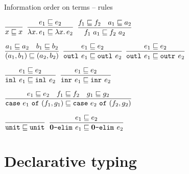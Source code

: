 \documentclass{beamer}
\begin{document}
\begin{frame}{Information order on terms -- rules}

\begin{center}
  $\displaystyle \frac{}{x \sqsubseteq x} \textsc{\footnotesize{}}$ \quad
  $\infrule{\termorder{e_1}{e_2}}{\termorder{\fun{x}{e_1}}{\fun{x}{e_2}}}$ \quad
  $\infrule{\termorder{f_1}{f_2} \quad \termorder{a_1}{a_2}}{\termorder{\app{f_1}{a_1}}{\app{f_2}{a_2}}}$

  \vspace{2em}

  $\displaystyle \frac{a_1 \sqsubseteq a_2 \quad b_1 \sqsubseteq b_2}{(a_1, b_1) \sqsubseteq (a_2, b_2)} \textsc{\footnotesize{}}$ \quad
  $\displaystyle \frac{e_1 \sqsubseteq e_2}{\texttt{outl}_{}\ e_1 \sqsubseteq \texttt{outl}_{}\ e_2} \textsc{\footnotesize{}}$ \quad
  $\displaystyle \frac{e_1 \sqsubseteq e_2}{\texttt{outl}_{}\ e_1 \sqsubseteq \texttt{outr}_{}\ e_2} \textsc{\footnotesize{}}$

  \vspace{2em}

  $\displaystyle \frac{e_1 \sqsubseteq e_2}{\texttt{inl}_{}\ e_1 \sqsubseteq \texttt{inl}_{}\ e_2} \textsc{\footnotesize{}}$ \quad
  $\displaystyle \frac{e_1 \sqsubseteq e_2}{\texttt{inr}_{}\ e_1 \sqsubseteq \texttt{inr}_{}\ e_2} \textsc{\footnotesize{}}$

  \vspace{2em}

  $\displaystyle \frac{e_1 \sqsubseteq e_2 \quad f_1 \sqsubseteq f_2 \quad g_1 \sqsubseteq g_2}{\texttt{case}\ e_1\ \texttt{of}\ (f_1, g_1) \sqsubseteq \texttt{case}\ e_2\ \texttt{of}\ (f_2, g_2)} \textsc{\footnotesize{}}$

  \vspace{2em}

  $\displaystyle \frac{}{\texttt{unit} \sqsubseteq \texttt{unit}} \textsc{\footnotesize{}}$ \quad
  $\displaystyle \frac{e_1 \sqsubseteq e_2}{\textbf{0}\texttt{-elim}_{}\ e_1 \sqsubseteq \textbf{0}\texttt{-elim}_{}\ e_2} \textsc{\footnotesize{}}$
\end{center}

\end{frame}




\section{Declarative typing}
\end{document}
